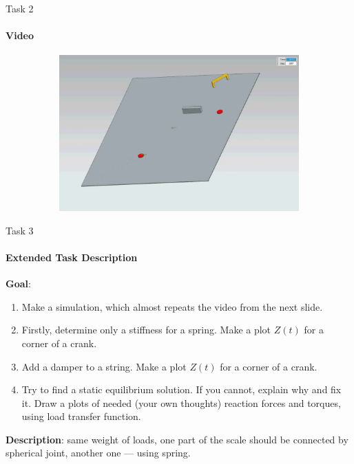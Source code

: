 \documentclass[aspectratio=169]{beamer}
\begin{document}
\begin{frame}[t]{Task 2}
    \framesubtitle{Video}
    \vspace{-0.6cm}
    \begin{figure}[H]
        \href{https://disk.yandex.ru/i/iwNthKk0RIUtEg}{
            \centering\includegraphics[height=6cm,width=1\textwidth,keepaspectratio]{2_preview.png}}
        \label{fig:2_preview.png}
    \end{figure}
\end{frame}

\begin{frame}[t]{Task 3}
    \framesubtitle{Extended Task Description}
    \textbf{Goal}: \begin{enumerate}
        \item Make a simulation, which almost repeats the video from the next slide.
        \item Firstly, determine only a stiffness for a spring. Make a plot $Z(t)$ for a corner of a crank.
        \item Add a damper to a string. Make a plot $Z(t)$ for a corner of a crank.
        \item Try to find a static equilibrium solution. If you cannot, explain why and fix it. Draw a plots of needed (your own thoughts) reaction forces and torques, using load transfer function.
    \end{enumerate}
    
    
    \smallskip

    \textbf{Description}: same weight of loads, one part of the scale should be connected by spherical joint, another one --- using spring.  
\end{frame}
\end{document}
